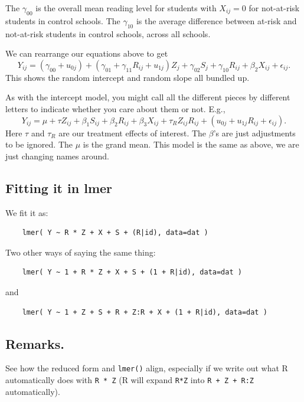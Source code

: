 \documentclass[
  letterpaper,
  DIV=11,
  numbers=noendperiod]{scrreprt}
\begin{document}
The \(\gamma_{00}\) is the overall mean reading level for students with
\(X_{ij}=0\) for not-at-risk students in control schools. The
\(\gamma_{10}\) is the average difference between at-risk and
not-at-risk students in control schools, across all schools.

We can rearrange our equations above to get
\[Y_{ij} = ( \gamma_{00} + u_{0j}) + (\gamma_{01} + \gamma_{11} R_{ij} + u_{1j} ) Z_{j} + \gamma_{02} S_{j} + \gamma_{10} R_{ij} + \beta_{2} X_{ij} + \epsilon_{ij} .\]
This shows the random intercept and random slope all bundled up.

As with the intercept model, you might call all the different pieces by
different letters to indicate whether you care about them or not. E.g.,
\[Y_{ij} = \mu + \tau Z_{ij}  + \beta_1 S_{ij} + \beta_2 R_{ij} + \beta_3 X_{ij} + \tau_{R} Z_{ij} R_{ij}  + (u_{0j} +  u_{1j} R_{ij} + \epsilon_{ij}) .\]
Here \(\tau\) and \(\tau_R\) are our treatment effects of interest. The
\(\beta\)'s are just adjustments to be ignored. The \(\mu\) is the grand
mean. This model is the same as above, we are just changing names
around.

\subsection{Fitting it in lmer}\label{fitting-it-in-lmer-1}

We fit it as:

\begin{verbatim}
    lmer( Y ~ R * Z + X + S + (R|id), data=dat )
\end{verbatim}

Two other ways of saying the same thing:

\begin{verbatim}
    lmer( Y ~ 1 + R * Z + X + S + (1 + R|id), data=dat )
\end{verbatim}

and

\begin{verbatim}
    lmer( Y ~ 1 + Z + S + R + Z:R + X + (1 + R|id), data=dat )
\end{verbatim}

\subsection{Remarks.}\label{remarks.-4}

See how the reduced form and \texttt{lmer()} align, especially if we
write out what R automatically does with \texttt{R\ *\ Z} (R will expand
\texttt{R*Z} into \texttt{R\ +\ Z\ +\ R:Z} automatically).
\end{document}
